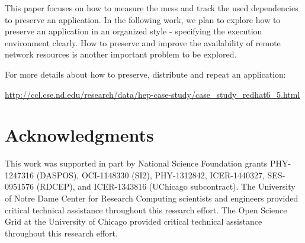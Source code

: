 \documentclass[procedia]{easychair}
\begin{document}
This paper focuses on how to measure the mess and track the used dependencies to preserve an application.
In the following work, we plan to explore how to preserve an application in an organized style - specifying the execution environment clearly.
How to preserve and improve the availability of remote network resources is another important problem to be explored.

For more details about how to preserve, distribute and repeat an application: 

\url{http://ccl.cse.nd.edu/research/data/hep-case-study/case\_study\_redhat6\_5.html}

\section*{Acknowledgments}

This work was supported in part by National Science Foundation grants PHY-1247316 (DASPOS), 
OCI-1148330 (SI2), PHY-1312842, ICER-1440327, SES-0951576 (RDCEP), and ICER-1343816 (UChicago subcontract).
The University of Notre Dame Center for Research Computing scientists and engineers provided critical technical assistance throughout this research effort.
The Open Science Grid at the University of Chicago provided critical technical assistance throughout this research effort.



\end{document}
